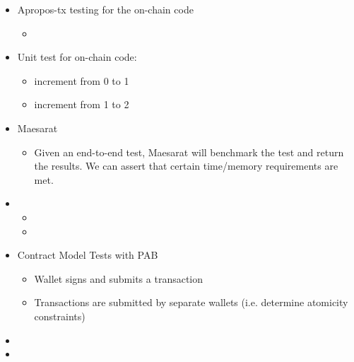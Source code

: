 \documentclass{article}
\begin{document}
\begin{itemize}
  \item Apropos-tx testing for the on-chain code
  \begin{itemize}
    \item {}
  \end{itemize}
  \item Unit test for on-chain code:
  \begin{itemize}
    \item increment from 0 to 1
    \item increment from 1 to 2
  \end{itemize}
  \item Maesarat
  \begin{itemize}
    \item Given an end-to-end test, Maesarat will benchmark the test and return the results. We can assert that certain time/memory requirements are met.
  \end{itemize}
  \item {}
  \begin{itemize}
    \item {}
    \item {}
  \end{itemize}
  \item Contract Model Tests with PAB
  \begin{itemize}
    \item Wallet signs and submits a transaction
    \item Transactions are submitted by separate wallets (i.e. determine atomicity constraints)
  \end{itemize}
  \item {}
  \item {}
\end{itemize}
\end{document}
